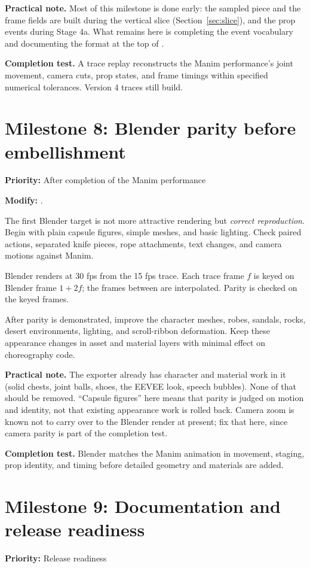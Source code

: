 \documentclass[12pt,letterpaper]{article}
\newcommand{\file}[1]{\texttt{\detokenize{#1}}}
\newcommand{\priority}[1]{\noindent\textbf{Priority:} #1\par\smallskip}
\newcommand{\completion}[1]{\par\medskip\noindent\textbf{Completion test.} #1\par}
\newcommand{\practical}[1]{\par\medskip\noindent\textbf{Practical note.} #1\par}
\begin{document}
\practical{Most of this milestone is done early: the sampled piece and the frame fields are built during the vertical slice (Section~\ref{sec:slice}), and the prop events during Stage 4a. What remains here is completing the event vocabulary and documenting the format at the top of \file{pam_trace.py}.}

\completion{A trace replay reconstructs the Manim performance's joint movement, camera cuts, prop states, and frame timings within specified numerical tolerances. Version 4 traces still build.}

\section{Milestone 8: Blender parity before embellishment}
\priority{After completion of the Manim performance}

\noindent\textbf{Modify:} \file{trace2blender.py}.

The first Blender target is not more attractive rendering but \emph{correct reproduction}. Begin with plain capsule figures, simple meshes, and basic lighting. Check paired actions, separated knife pieces, rope attachments, text changes, and camera motions against Manim.

Blender renders at 30 fps from the 15 fps trace. Each trace frame $f$ is keyed on Blender frame $1+2f$; the frames between are interpolated. Parity is checked on the keyed frames.

After parity is demonstrated, improve the character meshes, robes, sandals, rocks, desert environments, lighting, and scroll-ribbon deformation. Keep these appearance changes in asset and material layers with minimal effect on choreography code.

\practical{The exporter already has character and material work in it (solid chests, joint balls, shoes, the EEVEE look, speech bubbles). None of that should be removed. ``Capsule figures'' here means that parity is judged on motion and identity, not that existing appearance work is rolled back. Camera zoom is known not to carry over to the Blender render at present; fix that here, since camera parity is part of the completion test.}

\completion{Blender matches the Manim animation in movement, staging, prop identity, and timing before detailed geometry and materials are added.}

\section{Milestone 9: Documentation and release readiness}
\priority{Release readiness}
\end{document}

